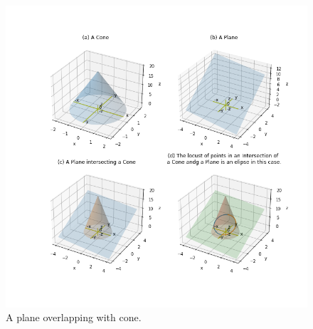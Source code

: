 \documentclass[10pt,a4paper,leqno]{article}
\begin{document}
\begin{CJK*}{UTF8}{gbsn}
 \par \ \par\begin{figure}[H]
\centering\includegraphics[width=1\linewidth,height=0.7\textheight]{Data/fgr02.png}
\caption{A plane overlapping with cone.}
\label{fig:Data/fgr02.png}
\end{figure}


\end{CJK*}
\end{document}
